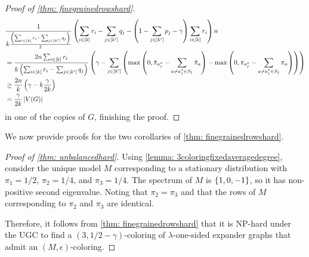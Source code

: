 \begin{proof}[Proof of \cref{thm: finegrainedrowshard}]
    \begin{align*}
        &\frac1{k\frac{\left(\sum_{i\in[k]} r_i-\sum_{j\in[k']} q_j\right)}{2}}\left(\sum_{i\in[k]} r_i-\sum_{j\in[k']} q_j-\left(1-\sum_{j\in[k']} p_j-\gamma\right)\sum_{i\in[k]} r_i\right)n\\
        &= \frac{2n\sum_{i\in[k]} r_i}{k\left(\sum_{i\in[k]} r_i-\sum_{j\in[k']} q_j\right)}\left(\gamma-\sum_{j\in[k']} \left(\max\left(0, \hat{\pi}_{a_j^*} - \sum_{\substack{a \neq a_j^{*} \in S_j}} \hat{\pi}_a\right)-\max\left(0, \pi_{a_j^{*}} - \sum_{\substack{a \neq a_j^{*} \in S_j}} \pi_a\right)\right)\right)\\
        &\geq  \frac{2n}{k}\left(\gamma-k\frac{\gamma}{2k}\right)\\
        &=\frac{\gamma}{2k} \left\lvert V(G)\right\rvert
    \end{align*}
    in one of the copies of $G$, finishing the proof.
\end{proof}

We now provide proofs for the two corollaries of \cref{thm: finegrainedrowshard}.

\begin{proof}[Proof of \cref{thm: unbalancedhard}]
    Using \cref{lemma: 3coloringfixedaveragedegree}, consider the unique model $M$ corresponding to a stationary distribution with $\pi_1 = 1/2$, $\pi_2 = 1/4$, and $\pi_3=1/4$. The spectrum of $M$ is $\left\{1, 0, -1\right\}$, so it has non-positive second eigenvalue. Noting that $\pi_2=\pi_3$ and that the rows of $M$ corresponding to $\pi_2$ and $\pi_3$ are identical.

    Therefore, it follows from \cref{thm: finegrainedrowshard} that it is NP-hard under the UGC to find a $(3, 1/2-\gamma)$-coloring of $\lambda$-one-sided expander graphs that admit an $(M, \epsilon)$-coloring.
\end{proof}

